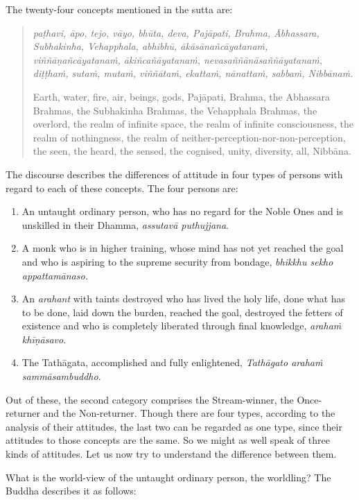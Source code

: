 The twenty-four concepts mentioned in the sutta are:

\begin{quote}
\emph{paṭhavi, āpo, tejo, vāyo, bhūta, deva, Pajāpati, Brahma, Ābhassara, Subhakinha, Vehapphala, abhibhū, ākāsānañcāyatanaṁ, viññāṇañcāyatanaṁ, ākiñcañāyatanaṁ, nevasaññānāsaññāyatanaṁ, diṭṭhaṁ, sutaṁ, mutaṁ, viññātaṁ, ekattaṁ, nānattaṁ, sabbaṁ, Nibbānaṁ.}

Earth, water, fire, air, beings, gods, Pajāpati, Brahma, the Abhassara Brahmas, the Subhakinha Brahmas, the Vehapphala Brahmas, the overlord, the realm of infinite space, the realm of infinite consciousness, the realm of nothingness, the realm of neither-perception-nor-non-perception, the seen, the heard, the sensed, the cognised, unity, diversity, all, Nibbāna.
\end{quote}

The discourse describes the differences of attitude in four types of persons with regard to each of these concepts. The four persons are:

\begin{enumerate}
\def\labelenumi{\arabic{enumi}.}
\item
  An untaught ordinary person, who has no regard for the Noble Ones and is unskilled in their Dhamma, \emph{assutavā puthujjana}.
\item
  A monk who is in higher training, whose mind has not yet reached the goal and who is aspiring to the supreme security from bondage, \emph{bhikkhu sekho appattamānaso.}
\item
  An \emph{arahant} with taints destroyed who has lived the holy life, done what has to be done, laid down the burden, reached the goal, destroyed the fetters of existence and who is completely liberated through final knowledge, \emph{arahaṁ khīṇāsavo}.
\item
  The Tathāgata, accomplished and fully enlightened, \emph{Tathāgato arahaṁ sammāsambuddho}.
\end{enumerate}

Out of these, the second category comprises the Stream-winner, the Once-returner and the Non-returner. Though there are four types, according to the analysis of their attitudes, the last two can be regarded as one type, since their attitudes to those concepts are the same. So we might as well speak of three kinds of attitudes. Let us now try to understand the difference between them.

What is the world-view of the untaught ordinary person, the worldling? The Buddha describes it as follows:


